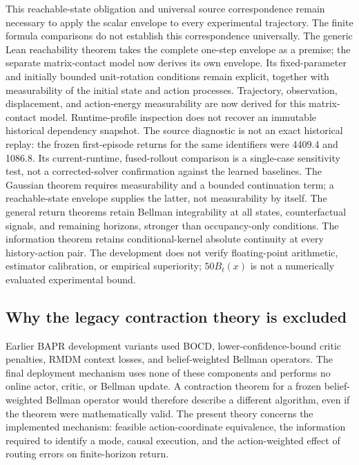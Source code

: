 This reachable-state obligation and universal source correspondence remain necessary to apply the scalar envelope to every experimental trajectory.
The finite formula comparisons do not establish this correspondence universally.
The generic Lean reachability theorem takes the complete one-step envelope as a premise; the separate matrix-contact model now derives its own envelope.
Its fixed-parameter and initially bounded unit-rotation conditions remain explicit, together with measurability of the initial state and action processes.
Trajectory, observation, displacement, and action-energy measurability are now derived for this matrix-contact model.
Runtime-profile inspection does not recover an immutable historical dependency snapshot.
The source diagnostic is not an exact historical replay: the frozen first-episode returns for the same identifiers were 4409.4 and 1086.8.
Its current-runtime, fused-rollout comparison is a single-case sensitivity test, not a corrected-solver confirmation against the learned baselines.
The Gaussian theorem requires measurability and a bounded continuation term; a reachable-state envelope supplies the latter, not measurability by itself.
The general return theorems retain Bellman integrability at all states, counterfactual signals, and remaining horizons, stronger than occupancy-only conditions.
The information theorem retains conditional-kernel absolute continuity at every history-action pair.
The development does not verify floating-point arithmetic, estimator calibration, or empirical superiority; $50B_t(x)$ is not a numerically evaluated experimental bound.

\subsection{Why the legacy contraction theory is excluded}

Earlier BAPR development variants used BOCD, lower-confidence-bound critic penalties, RMDM context losses, and belief-weighted Bellman operators. The final deployment mechanism uses none of these components and performs no online actor, critic, or Bellman update. A contraction theorem for a frozen belief-weighted Bellman operator would therefore describe a different algorithm, even if the theorem were mathematically valid. The present theory concerns the implemented mechanism: feasible action-coordinate equivalence, the information required to identify a mode, causal execution, and the action-weighted effect of routing errors on finite-horizon return.

